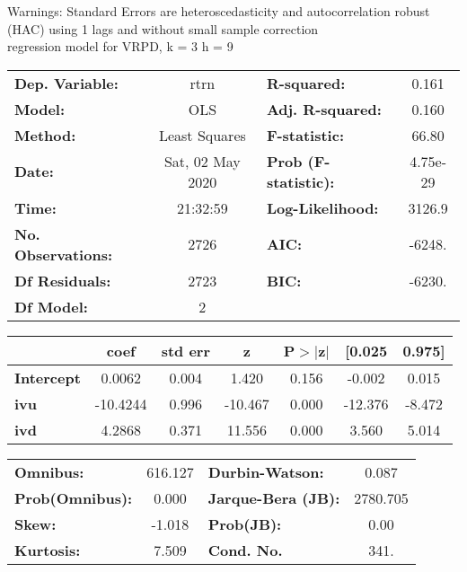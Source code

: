 Warnings: \newline
 [1] Standard Errors are heteroscedasticity and autocorrelation robust (HAC) using 1 lags and without small sample correction\\ 

regression model for VRPD, k = 3 h = 9\begin{center}
\begin{tabular}{lclc}
\toprule
\textbf{Dep. Variable:}    &       rtrn       & \textbf{  R-squared:         } &     0.161   \\
\textbf{Model:}            &       OLS        & \textbf{  Adj. R-squared:    } &     0.160   \\
\textbf{Method:}           &  Least Squares   & \textbf{  F-statistic:       } &     66.80   \\
\textbf{Date:}             & Sat, 02 May 2020 & \textbf{  Prob (F-statistic):} &  4.75e-29   \\
\textbf{Time:}             &     21:32:59     & \textbf{  Log-Likelihood:    } &    3126.9   \\
\textbf{No. Observations:} &        2726      & \textbf{  AIC:               } &    -6248.   \\
\textbf{Df Residuals:}     &        2723      & \textbf{  BIC:               } &    -6230.   \\
\textbf{Df Model:}         &           2      & \textbf{                     } &             \\
\bottomrule
\end{tabular}
\begin{tabular}{lcccccc}
                   & \textbf{coef} & \textbf{std err} & \textbf{z} & \textbf{P$> |$z$|$} & \textbf{[0.025} & \textbf{0.975]}  \\
\midrule
\textbf{Intercept} &       0.0062  &        0.004     &     1.420  &         0.156        &       -0.002    &        0.015     \\
\textbf{ivu}       &     -10.4244  &        0.996     &   -10.467  &         0.000        &      -12.376    &       -8.472     \\
\textbf{ivd}       &       4.2868  &        0.371     &    11.556  &         0.000        &        3.560    &        5.014     \\
\bottomrule
\end{tabular}
\begin{tabular}{lclc}
\textbf{Omnibus:}       & 616.127 & \textbf{  Durbin-Watson:     } &    0.087  \\
\textbf{Prob(Omnibus):} &   0.000 & \textbf{  Jarque-Bera (JB):  } & 2780.705  \\
\textbf{Skew:}          &  -1.018 & \textbf{  Prob(JB):          } &     0.00  \\
\textbf{Kurtosis:}      &   7.509 & \textbf{  Cond. No.          } &     341.  \\
\bottomrule
\end{tabular}
\end{center}

